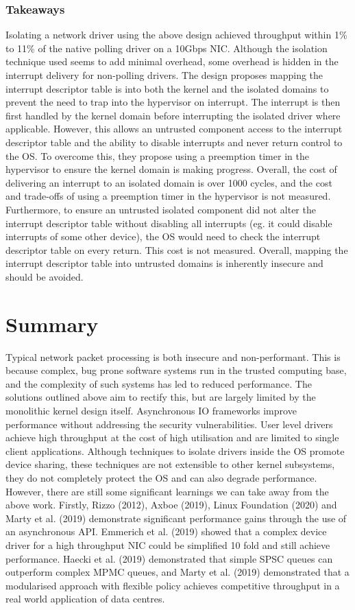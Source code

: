 \subsubsection{Takeaways}
Isolating a network driver using the above design achieved throughput within 1\% to 11\% of the native polling driver on a
10Gbps NIC. Although the isolation technique used seems to add minimal overhead, some overhead is hidden in the interrupt
delivery for non-polling drivers. The design proposes mapping the interrupt descriptor table is into both the kernel
and the isolated domains to prevent the need to trap into the hypervisor on interrupt. The interrupt is
then first handled by the kernel domain before interrupting the isolated driver where applicable. 
However, this allows an untrusted component access to the interrupt descriptor table and the ability to disable interrupts 
and never return control to the OS. To overcome this, they propose using a preemption timer in the hypervisor to ensure the 
kernel domain is making progress. Overall, the cost of delivering an interrupt to an isolated 
domain is over 1000 cycles, and the cost and trade-offs of using a preemption timer
in the hypervisor is not measured. Furthermore, to ensure an untrusted isolated component did not alter the interrupt
descriptor table without disabling all interrupts (eg. it could disable interrupts of some other device), the OS would
need to check the interrupt descriptor table on every return. This cost is not measured. Overall, mapping the interrupt
descriptor table into untrusted domains is inherently insecure and should be avoided. 

\section{Summary}
Typical network packet processing is both insecure and non-performant. This is because complex, bug prone software systems
run in the trusted computing base, and the complexity of such systems has led to reduced performance. The solutions outlined above
aim to rectify this, but are largely limited by the monolithic kernel design itself. 
Asynchronous IO frameworks improve performance without addressing the security vulnerabilities. User level drivers
achieve high throughput at the cost of high utilisation and are limited to single client applications. Although techniques to
isolate drivers inside the OS promote device sharing, these techniques are not extensible to other kernel subsystems, they
do not completely protect the OS and can also degrade performance. However, there are still some significant
learnings we can take away from the above work. Firstly, Rizzo (2012), Axboe (2019), Linux Foundation (2020) and Marty et al. (2019)
demonstrate significant performance gains through the use of an asynchronous API. Emmerich et al. (2019) showed that a complex
device driver for a high throughput NIC could be simplified 10 fold and still achieve performance. Haecki et al. (2019)
demonstrated that simple SPSC queues can outperform complex MPMC queues, and Marty et al. (2019) demonstrated that a
modularised approach with flexible policy achieves competitive throughput in a real world application of data centres.
